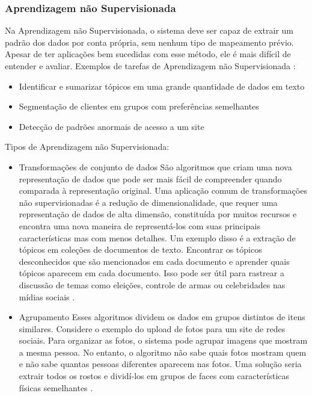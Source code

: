 \documentclass[
	12pt,				%
	openright,			%
	oneside,			%
	a4paper,			%
	english,			%
	spanish,			%
	brazil				%
	]{abntex2}
\begin{document}
	\subsubsection*{Aprendizagem não Supervisionada}
		Na Aprendizagem não Supervisionada, o sistema deve ser capaz de extrair um padrão dos dados por conta própria, sem nenhum tipo de mapeamento prévio. Apesar de ter aplicações bem sucedidas com esse método, ele é mais difícil de entender e avaliar. Exemplos de tarefas de Aprendizagem não Supervisionada \cite {guido_muller}: 
	\begin{itemize}
	 	\item Identificar e sumarizar tópicos em uma grande quantidade de dados em texto
		\item Segmentação de clientes em grupos com preferências semelhantes
		\item Detecção de padrões anormais de acesso a um site
	\end{itemize}

	Tipos de Aprendizagem não Supervisionada:
	\begin{itemize}
	 	\item Transformações de conjunto de dados
			\subitem São algoritmos que criam uma nova representação de dados que pode ser mais fácil de compreender quando comparada à representação original. Uma aplicação comum de transformações não supervisionadas é a redução de dimensionalidade, que requer uma representação de dados de alta dimensão, constituída por muitos recursos e encontra uma nova maneira de representá-los com suas principais características mas com menos detalhes. Um exemplo disso é a extração de tópicos em coleções de documentos de texto. Encontrar os tópicos desconhecidos que são mencionados em cada documento e aprender quais tópicos aparecem em cada documento. Isso pode ser útil para rastrear a discussão de temas como eleições, controle de armas ou celebridades nas mídias sociais \cite {guido_muller}.
		\item Agrupamento
			\subitem  Esses algoritmos dividem os dados em grupos distintos de itens similares. Considere o exemplo do upload de fotos para um site de redes sociais. Para organizar as fotos, o sistema pode agrupar imagens que mostram a mesma pessoa. No entanto, o algoritmo não sabe quais fotos mostram quem e não sabe quantas pessoas diferentes aparecem nas fotos. Uma solução seria extrair todos os rostos e dividí-los em grupos de faces com características físicas semelhantes \cite {guido_muller}.
	\end{itemize}
\end{document}

